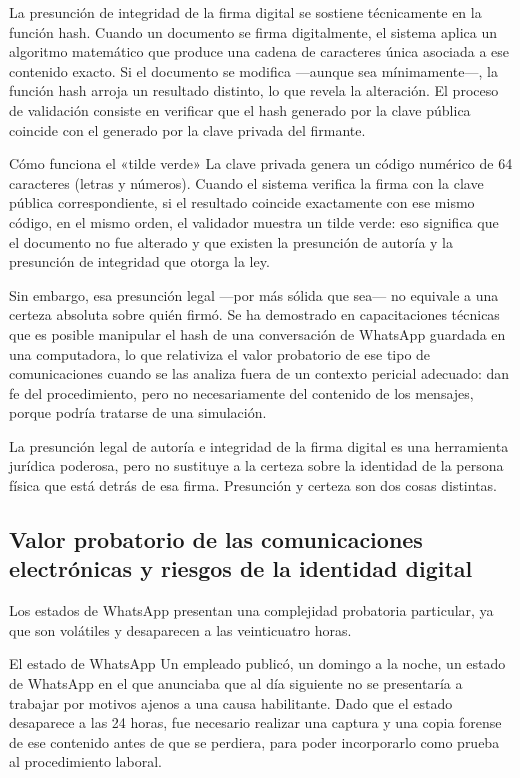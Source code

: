 \documentclass[12pt,oneside]{book}
\begin{document}
La presunción de integridad de la firma digital se sostiene técnicamente en la función hash. Cuando un documento se firma digitalmente, el sistema aplica un algoritmo matemático que produce una cadena de caracteres única asociada a ese contenido exacto. Si el documento se modifica ---aunque sea mínimamente---, la función hash arroja un resultado distinto, lo que revela la alteración. El proceso de validación consiste en verificar que el hash generado por la clave pública coincide con el generado por la clave privada del firmante.

\begin{example}{Cómo funciona el «tilde verde»}
La clave privada genera un código numérico de 64 caracteres (letras y números). Cuando el sistema verifica la firma con la clave pública correspondiente, si el resultado coincide exactamente con ese mismo código, en el mismo orden, el validador muestra un tilde verde: eso significa que el documento no fue alterado y que existen la presunción de autoría y la presunción de integridad que otorga la ley.
\end{example}

Sin embargo, esa presunción legal ---por más sólida que sea--- no equivale a una certeza absoluta sobre quién firmó. Se ha demostrado en capacitaciones técnicas que es posible manipular el hash de una conversación de WhatsApp guardada en una computadora, lo que relativiza el valor probatorio de ese tipo de comunicaciones cuando se las analiza fuera de un contexto pericial adecuado: dan fe del procedimiento, pero no necesariamente del contenido de los mensajes, porque podría tratarse de una simulación.

\begin{important}
La presunción legal de autoría e integridad de la firma digital es una herramienta jurídica poderosa, pero no sustituye a la certeza sobre la identidad de la persona física que está detrás de esa firma. Presunción y certeza son dos cosas distintas.
\end{important}

\subsection{Valor probatorio de las comunicaciones electrónicas y riesgos de la identidad digital}

Los estados de WhatsApp presentan una complejidad probatoria particular, ya que son volátiles y desaparecen a las veinticuatro horas.

\begin{example}{El estado de WhatsApp}
Un empleado publicó, un domingo a la noche, un estado de WhatsApp en el que anunciaba que al día siguiente no se presentaría a trabajar por motivos ajenos a una causa habilitante. Dado que el estado desaparece a las 24 horas, fue necesario realizar una captura y una copia forense de ese contenido antes de que se perdiera, para poder incorporarlo como prueba al procedimiento laboral.
\end{example}
\end{document}
